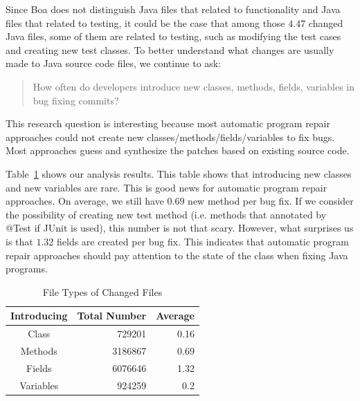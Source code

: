 \documentclass{sig-alternate-05-2015}
\begin{document}
Since Boa does not distinguish Java files that related to functionality and Java
files that related to testing, it could be the case that among those $4.47$
changed Java files, some of them are related to testing, such as modifying the
test cases and creating new test classes. To better understand what changes are
usually made to Java source code files, we continue to ask:

\begin{quote}
	How often do developers introduce new classes, methods, fields, variables in
	bug fixing commits?
\end{quote}

This research question is interesting because most automatic program repair
approaches could not create new classes/methods/fields/variables to fix bugs.
Most approaches guess and synthesize the patches based on existing source code.

Table~\ref{tbl:new} shows our analysis results. This table shows that
introducing new classes and new variables are rare. This is good news for
automatic program repair approaches. On average, we still have $0.69$ new method
per bug fix. If we consider the possibility of creating new test method (i.e.
methods that annotated by @Test if JUnit is used), this number is not that
scary. However, what surprises us is that $1.32$ fields are created per bug fix.
This indicates that automatic program repair approaches should pay attention to
the state of the class when fixing Java programs.

\begin{table}
\centering
  \begin{tabular}{| c | r | r |}
  \hline
  Introducing & Total Number & Average \\ \hline \hline
  Class & 729201 & 0.16 \\ \hline
  Methods & 3186867 & 0.69 \\ \hline
  Fields & 6076646 & 1.32 \\ \hline
  Variables & 924259 & 0.2 \\ \hline
  \end{tabular}
  \caption{File Types of Changed Files}
  \label{tbl:new}
\end{table}
\end{document}

